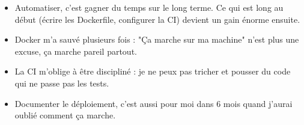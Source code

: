 \begin{itemize}
    \item Automatiser, c'est gagner du temps sur le long terme. Ce qui est long au début (écrire les Dockerfile, configurer la CI) devient un gain énorme ensuite.
    \item Docker m'a sauvé plusieurs fois : "Ça marche sur ma machine" n'est plus une excuse, ça marche pareil partout.
    \item La CI m'oblige à être discipliné : je ne peux pas tricher et pousser du code qui ne passe pas les tests.
    \item Documenter le déploiement, c'est aussi pour moi dans 6 mois quand j'aurai oublié comment ça marche.
\end{itemize}